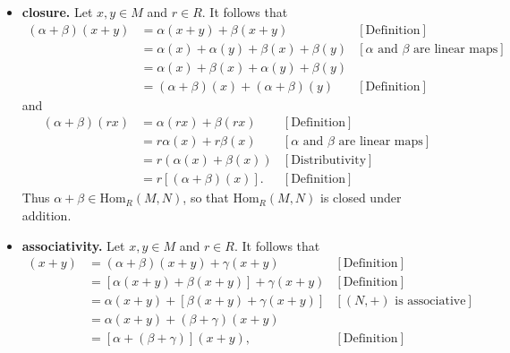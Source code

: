 \documentclass[9pt]{article}
\begin{document}
\begin{enumerate}
      \begin{itemize}
         \item \textbf{closure.} Let $x, y \in M$ and $r \in R$. It follows that
               \begin{align*}
                  (\alpha + \beta)(x + y) &= \alpha(x + y) + \beta(x + y)
                     &[\text{Definition}] \\
                     &= \alpha(x) + \alpha(y) + \beta(x) + \beta(y)
                        &[\alpha \text{ and } \beta \text{ are linear maps}] \\
                     &= \alpha(x) + \beta(x) + \alpha(y) + \beta(y) \\
                     &= (\alpha+\beta)(x) + (\alpha+\beta)(y)
                        &[\text{Definition}] 
               \end{align*}
               and
               \begin{align*}
                  (\alpha + \beta)(rx) &= \alpha(rx) + \beta(rx)
                     &[\text{Definition}] \\
                     &= r\alpha(x) + r\beta(x)
                        &[\alpha \text{ and } \beta \text{ are linear maps}] \\
                     &= r(\alpha(x) + \beta(x)) &[\text{Distributivity}] \\
                     &= r[(\alpha+\beta)(x)]. &[\text{Definition}] 
               \end{align*}
               Thus $\alpha+\beta \in \text{Hom}_R(M, N)$, so that
               $\text{Hom}_R(M, N)$ is closed under addition.
         \item \textbf{associativity.} Let $x, y \in M$ and $r \in R$. It
               follows that
               \begin{align*}
                  [(\alpha + \beta) + \gamma](x + y) &=
                     (\alpha+\beta)(x + y) + \gamma(x + y)
                     &[\text{Definition}] \\
                     &= [\alpha(x + y) + \beta(x + y)] + \gamma(x + y)
                        &[\text{Definition}] \\
                     &= \alpha(x + y) + [\beta(x + y) + \gamma(x + y)]
                        &[(N, +) \text{ is associative}] \\
                     &= \alpha(x + y) + (\beta+\gamma)(x + y) \\
                     &= [\alpha + (\beta + \gamma)](x+y), &[\text{Definition}]

\end{align*}
\end{itemize}
\end{enumerate}
\end{document}
